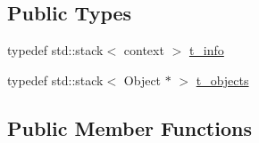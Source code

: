 \subsection*{Public Types}
\begin{DoxyCompactItemize}
\item 
typedef std\-::stack$<$ context $>$ \hyperlink{classxtd_1_1servers_1_1app_1_1HtmlOArchive_aedb461454d0c255709664fcccc379cf5}{t\-\_\-info}
\item 
typedef std\-::stack$<$ Object $\ast$ $>$ \hyperlink{classxtd_1_1servers_1_1app_1_1HtmlOArchive_a0409a4336819121b7ec0d402ffca9cdf}{t\-\_\-objects}
\end{DoxyCompactItemize}
\subsection*{Public Member Functions}
